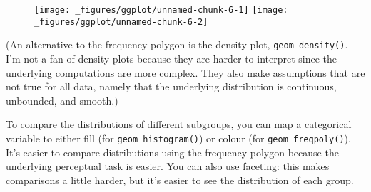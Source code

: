 \begin{Shaded}
\begin{Highlighting}[]
\StringTok{ }
\StringTok{  }\NormalTok{(} \NormalTok{)}
\StringTok{ }
\StringTok{  }\NormalTok{(} \NormalTok{)}
\end{Highlighting}
\end{Shaded}

\begin{figure}[H]
  \texttt{[image: \_figures/ggplot/unnamed-chunk-6-1]}%
  \texttt{[image: \_figures/ggplot/unnamed-chunk-6-2]}
\end{figure}

(An alternative to the frequency polygon is the density plot,
\texttt{geom\_density()}. I'm not a fan of density plots because they
are harder to interpret since the underlying computations are more
complex. They also make assumptions that are not true for all data,
namely that the underlying distribution is continuous, unbounded, and
smooth.)

To compare the distributions of different subgroups, you can map a
categorical variable to either fill (for \texttt{geom\_histogram()}) or
colour (for \texttt{geom\_freqpoly()}). It's easier to compare
distributions using the frequency polygon because the underlying
perceptual task is easier. You can also use faceting: this makes
comparisons a little harder, but it's easier to see the distribution of
each group.

\begin{Shaded}
\begin{Highlighting}[]
 \StringTok{ }
\StringTok{  }\NormalTok{(} \NormalTok{)}
 \StringTok{ }
\StringTok{  }\NormalTok{(} \NormalTok{) +}\StringTok{ }
\StringTok{  } \NormalTok{)}
\end{Highlighting}
\end{Shaded}

